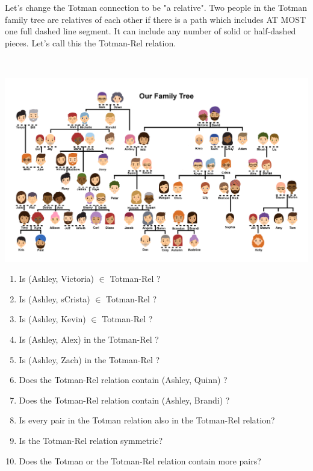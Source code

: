 \documentclass{ximera}
\begin{document}
                                                                                                            
Let's change the Totman connection to be "a relative". Two people in the Totman family tree are relatives of each other if there is a path which includes AT MOST one full dashed line segment. It can include any number of solid or half-dashed pieces. Let's call this the Totman-Rel relation.



\begin{exercise}
\quad \\
\begin{center}
\begin{image}
\includegraphics{Totman_Family_Tree.png}
\end{image}
\end{center}
\begin{enumerate}
\item Is (Ashley, Victoria) $\in$ Totman-Rel ? 
\item Is (Ashley, sCrista) $\in$ Totman-Rel ?
\item Is (Ashley, Kevin) $\in$ Totman-Rel ?
\item Is (Ashley, Alex) in the  Totman-Rel ?
\item Is (Ashley, Zach) in the  Totman-Rel ?
\item Does the Totman-Rel relation contain (Ashley, Quinn) ?
\item Does the Totman-Rel relation contain (Ashley, Brandi) ?
\item Is every pair in the Totman relation also in the Totman-Rel relation?
\item Is the Totman-Rel relation symmetric?
\item Does the Totman or the Totman-Rel relation contain more pairs?
\end{enumerate}

\end{exercise}
\end{document}
